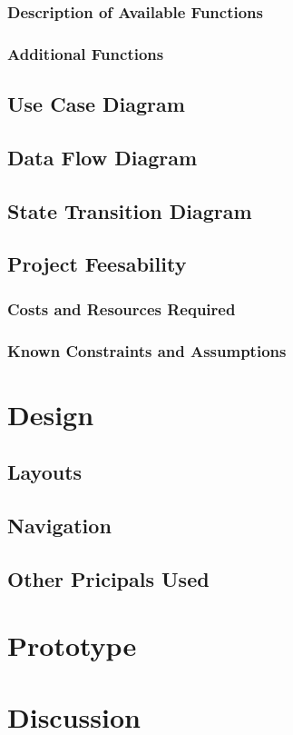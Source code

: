 \documentclass{article}
\begin{document}
\subsubsection{Description of Available Functions}
\subsubsection{Additional Functions}
\subsection{Use Case Diagram}
\subsection{Data Flow Diagram}
\subsection{State Transition Diagram}
\subsection{Project Feesability}
\subsubsection{Costs and Resources Required}
\subsubsection{Known Constraints and Assumptions}

\section{Design}
\subsection{Layouts}
\subsection{Navigation}
\subsection{Other Pricipals Used}

\section{Prototype}

\section{Discussion}
\end{document}
